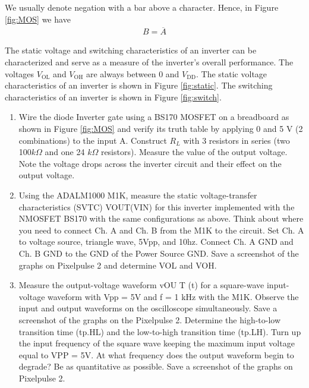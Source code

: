 \documentclass[12pt]{../manual}
\begin{document}
We usually denote negation with a bar above a character. Hence, in Figure \ref{fig:MOS} we have 
\begin{align}
B = \overline{A}
\end{align}

The static voltage and switching characteristics of an inverter can be characterized and serve as a measure of the inverter's overall performance. The voltages $V_\mathrm{OL}$ and $V_\mathrm{OH}$ are always between 0 and $V_\mathrm{DD}$. The static voltage characteristics of an inverter is shown in Figure \ref{fig:static}. The switching characteristics of an inverter is shown in Figure \ref{fig:switch}.

\begin{enumerate}
\item Wire the diode Inverter gate using a BS170 MOSFET on a breadboard as shown in Figure \ref{fig:MOS} and verify its
truth table by applying 0 and 5 V (2 combinations) to the input A. Construct $R_{L}$ with 3 resistors in series (two 100$k\Omega$ and one 24 $k\Omega$ resistors). Measure the value of
the output voltage. Note the voltage drops across the inverter circuit and their effect on
the output voltage.
\item Using the ADALM1000 M1K, measure the static voltage-transfer characteristics (SVTC)
VOUT(VIN) for this inverter implemented with the NMOSFET BS170 with the same configurations as above. Think about where you need to connect Ch. A and Ch. B from the M1K to the circuit. Set Ch. A to voltage source, triangle wave, 5Vpp, and 10hz. Connect Ch. A GND and Ch. B GND to the GND of the Power Source GND. Save a screenshot of the graphs on Pixelpulse 2 and determine VOL and VOH.
\item Measure the output-voltage waveform vOU T (t) for a square-wave input-voltage
waveform with Vpp = 5V and f = 1 kHz with the M1K. Observe the input and output waveforms on the oscilloscope simultaneously. Save a screenshot of the graphs on the Pixelpulse 2. Determine the high-to-low transition time (tp.HL) and the low-to-high transition time (tp.LH). Turn up the
input frequency of the square wave keeping the maximum input voltage equal to VPP =
5V. At what frequency does the output waveform begin to degrade? Be as quantitative
as possible. Save a screenshot of the graphs on Pixelpulse 2.
\end{enumerate}
\end{document}
